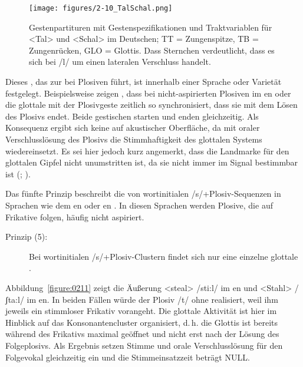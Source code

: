 \begin{figure}
	\texttt{[image: figures/2-10\_TalSchal.png]}
	\caption{Gestenpartituren mit Gestenspezifikationen und Traktvariablen für <Tal> und <Schal> im Deutschen; TT = Zungenspitze, TB = Zungenrücken, GLO = Glottis. Dass Sternchen verdeutlicht, dass es sich bei /l/ um einen lateralen Verschluss handelt.}
	\label{figure:0210}
\end{figure}

Dieses , das zur  bei Plosiven führt, ist innerhalb einer Sprache oder Varietät festgelegt. Beispielsweise zeigen \citet{Sawashima1980}, dass bei nicht-aspirierten Plosiven im en oder  die glottale  mit der Plosivgeste zeitlich so synchronisiert, dass sie mit dem Lösen des Plosivs endet. Beide gestischen  starten und enden gleichzeitig. Als Konsequenz ergibt sich keine  auf akustischer Oberfläche, da mit oraler Verschlusslösung des Plosivs die Stimmhaftigkeit des glottalen Systems wiedereinsetzt. Es sei hier jedoch kurz angemerkt, dass die Landmarke für den glottalen Gipfel nicht unumstritten ist, da sie nicht immer im Signal bestimmbar ist (\citealt{Hoole2006}; \citealt{Pouplier2011a}).

Das fünfte Prinzip beschreibt die  von wortinitialen /s/+Plosiv-Sequenzen in Sprachen wie dem en \citep{Browman1986} oder en \citep{Hoole2006}. In diesen Sprachen werden Plosive, die auf Frikative folgen, häufig nicht aspiriert. 

\begin{description}
	\item[Prinzip (5):] Bei wortinitialen /s/+Plosiv-Clustern findet sich nur eine einzelne glottale .
\end{description}

Abbildung~\ref{figure:0211} zeigt die Äußerung <steal> /sti:l/ im en und <Stahl> /ʃta:l/ im en. In beiden Fällen würde der Plosiv /t/ ohne  realisiert, weil ihm jeweils ein stimmloser Frikativ vorangeht. Die glottale Aktivität ist hier im Hinblick auf das Konsonantencluster organisiert, d.\,h. die Glottis ist bereits während des Frikativs maximal geöffnet und nicht erst nach der Lösung des Folgeplosivs. Als Ergebnis setzen Stimme und orale Verschlusslösung für den Folgevokal gleichzeitig ein und die Stimmeinsatzzeit beträgt NULL. 




